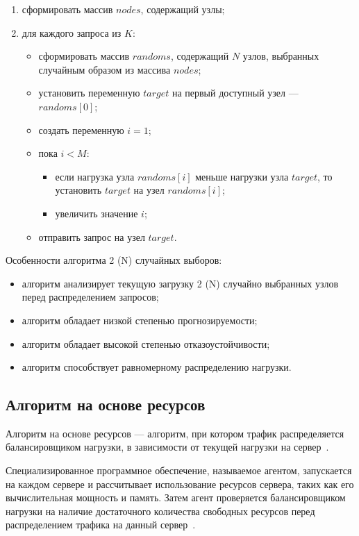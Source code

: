 \begin{enumerate}
	\item сформировать массив $nodes$, содержащий узлы;
	\item для каждого запроса из $K$:
	\begin{itemize}
		\item сформировать массив $randoms$, содержащий $N$ узлов, выбранных случайным образом из массива $nodes$;
		\item установить переменную $target$ на первый доступный узел --- $randoms[0]$;
		\item создать переменную $i = 1$;
		\item пока $i < M$:
		\begin{itemize}
			\item если нагрузка узла $randoms[i]$ меньше нагрузки узла $target$, то установить $target$ на узел $randoms[i]$;
			\item увеличить значение $i$;
		\end{itemize}
		\item отправить запрос на узел $target$.
	\end{itemize}
\end{enumerate}

Особенности алгоритма 2 (N) случайных выборов:
\begin{itemize}
    \item алгоритм анализирует текущую загрузку 2 (N) случайно выбранных узлов перед распределением запросов;
    \item алгоритм обладает низкой степенью прогнозируемости;
    \item алгоритм обладает высокой степенью отказоустойчивости;
    \item алгоритм способствует равномерному распределению нагрузки.
\end{itemize}

\subsection{Алгоритм на основе ресурсов}

Алгоритм на основе ресурсов --- алгоритм, при котором трафик распределяется балансировщиком нагрузки, в зависимости от текущей нагрузки на сервер~\cite{aws}.

Специализированное программное обеспечение, называемое агентом, запускается на каждом сервере и рассчитывает использование ресурсов сервера, таких как его вычислительная мощность и память. 
Затем агент проверяется балансировщиком нагрузки на наличие достаточного количества свободных ресурсов перед распределением трафика на данный сервер~\cite{aws}.

